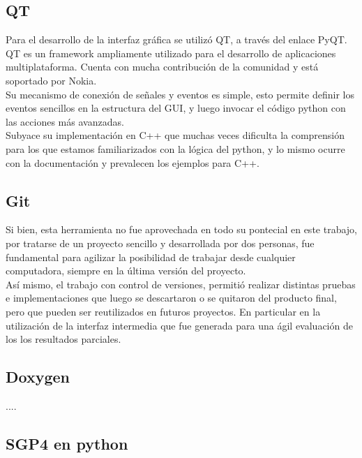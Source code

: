 \subsection*{QT}
Para el desarrollo de la interfaz gr\'afica se utiliz\'o QT, a trav\'es del enlace PyQT.\\
QT es un framework ampliamente utilizado para el desarrollo de aplicaciones multiplataforma. Cuenta con mucha contribuci\'on de la comunidad y est\'a soportado por Nokia.\\ Su mecanismo de conexión de señales y eventos es simple, esto permite definir los eventos sencillos en la estructura del GUI, y luego invocar el c\'odigo python con las acciones m\'as avanzadas.\\
Subyace su implementaci\'on en C++ que muchas veces dificulta la comprensi\'on para los que estamos familiarizados con la l\'ogica del python, y lo mismo ocurre con la documentaci\'on y prevalecen los ejemplos para C++.\\

\subsection*{Git}
Si bien, esta herramienta no fue aprovechada en todo su pontecial en este trabajo, por tratarse de un proyecto sencillo y desarrollada por dos personas, fue fundamental para agilizar la posibilidad de trabajar desde cualquier computadora, siempre en la \'ultima versi\'on del proyecto.\\
As\'i mismo, el trabajo con control de versiones, permiti\'o realizar distintas pruebas e implementaciones que luego se descartaron o se quitaron del producto final, pero que pueden ser reutilizados en futuros proyectos. En particular en la utilizaci\'on de la interfaz intermedia que fue generada para una \'agil evaluaci\'on de los los resultados parciales.\\


\subsection*{Doxygen}
....

\subsection*{SGP4 en python}







